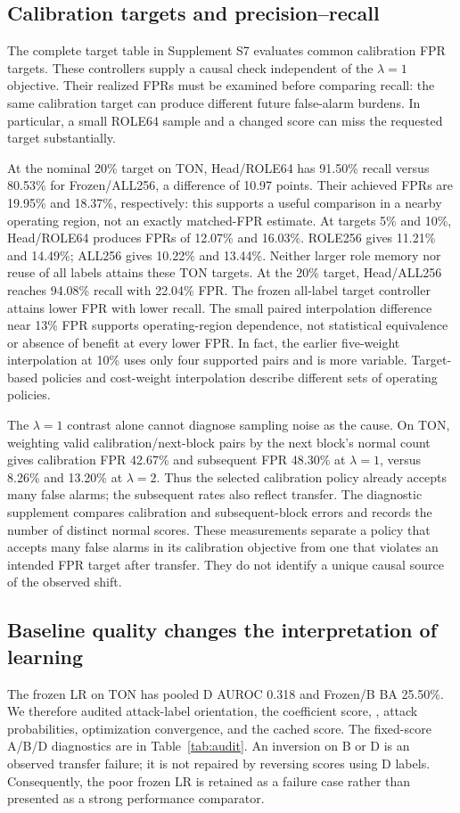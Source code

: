\subsection{Calibration targets and precision--recall}
The complete target table in Supplement S7 evaluates common calibration FPR targets. These controllers supply a causal check independent of the $\lambda=1$ objective. Their realized FPRs must be examined before comparing recall: the same calibration target can produce different future false-alarm burdens. In particular, a small ROLE64 sample and a changed score can miss the requested target substantially.



At the nominal 20\% target on TON, Head/ROLE64 has 91.50\% recall versus 80.53\% for Frozen/ALL256, a difference of 10.97 points. Their achieved FPRs are 19.95\% and 18.37\%, respectively: this supports a useful comparison in a nearby operating region, not an exactly matched-FPR estimate. At targets 5\% and 10\%, Head/ROLE64 produces FPRs of 12.07\% and 16.03\%. ROLE256 gives 11.21\% and 14.49\%; ALL256 gives 10.22\% and 13.44\%. Neither larger role memory nor reuse of all labels attains these TON targets. At the 20\% target, Head/ALL256 reaches 94.08\% recall with 22.04\% FPR. The frozen all-label target controller attains lower FPR with lower recall. The small paired interpolation difference near 13\% FPR supports operating-region dependence, not statistical equivalence or absence of benefit at every lower FPR. In fact, the earlier five-weight interpolation at 10\% uses only four supported pairs and is more variable. Target-based policies and cost-weight interpolation describe different sets of operating policies.

The $\lambda=1$ contrast alone cannot diagnose sampling noise as the cause. On TON, weighting valid calibration/next-block pairs by the next block's normal count gives calibration FPR 42.67\% and subsequent FPR 48.30\% at $\lambda=1$, versus 8.26\% and 13.20\% at $\lambda=2$. Thus the selected calibration policy already accepts many false alarms; the subsequent rates also reflect transfer. The diagnostic supplement compares calibration and subsequent-block errors and records the number of distinct normal scores. These measurements separate a policy that accepts many false alarms in its calibration objective from one that violates an intended FPR target after transfer. They do not identify a unique causal source of the observed shift.

\subsection{Baseline quality changes the interpretation of learning}
The frozen LR on TON has pooled D AUROC 0.318 and Frozen/B BA 25.50\%. We therefore audited attack-label orientation, the coefficient score, , attack probabilities, optimization convergence, and the cached score. The fixed-score A/B/D diagnostics are in Table~\ref{tab:audit}. An inversion on B or D is an observed transfer failure; it is not repaired by reversing scores using D labels. Consequently, the poor frozen LR is retained as a failure case rather than presented as a strong performance comparator.

